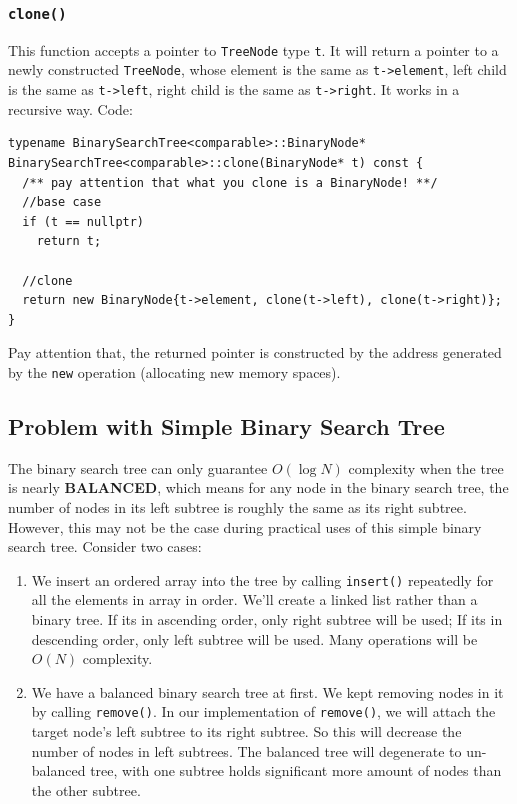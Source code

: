 \documentclass[11pt]{book}
\begin{document}
\subsubsection{\texttt{clone()}}
\label{sec:org31862ef}
This function accepts a pointer to \texttt{TreeNode} type \texttt{t}. It will return a pointer to a newly constructed \texttt{TreeNode}, whose element is the same as \texttt{t->element}, left child is the same as \texttt{t->left}, right child is the same as \texttt{t->right}. It works in a recursive way. Code:
\begin{verbatim}
typename BinarySearchTree<comparable>::BinaryNode* BinarySearchTree<comparable>::clone(BinaryNode* t) const {
  /** pay attention that what you clone is a BinaryNode! **/
  //base case 
  if (t == nullptr)
    return t;

  //clone 
  return new BinaryNode{t->element, clone(t->left), clone(t->right)};
}
\end{verbatim}

Pay attention that, the returned pointer is constructed by the address generated by the \texttt{new} operation (allocating new memory spaces).

\subsection{Problem with Simple Binary Search Tree}
\label{sec:org9bde72f}
The binary search tree can only guarantee \(O(\log{N})\) complexity when the tree is nearly \textbf{BALANCED}, which means for any node in the binary search tree, the number of nodes in its left subtree is roughly the same as its right subtree. However, this may not be the case during practical uses of this simple binary search tree. Consider two cases:
\begin{enumerate}
\item We insert an ordered array into the tree by calling \texttt{insert()} repeatedly for all the elements in array in order. We'll create a linked list rather than a binary tree. If its in ascending order, only right subtree will be used; If its in descending order, only left subtree will be used. Many operations will be \(O(N)\) complexity.
\item We have a balanced binary search tree at first. We kept removing nodes in it by calling \texttt{remove()}. In our implementation of \texttt{remove()}, we will attach the target node's left subtree to its right subtree. So this will decrease the number of nodes in left subtrees. The balanced tree will degenerate to un-balanced tree, with one subtree holds significant more amount of nodes than the other subtree.
\end{enumerate}
\end{document}
